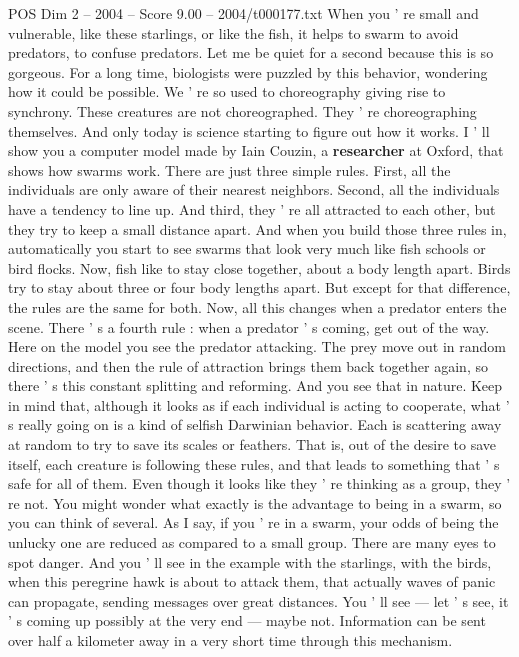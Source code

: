 \begin{textsample}{POS Dim 2 – 2004 – Score 9.00 – 2004/t000177.txt}
When you ' re small and vulnerable, like these starlings, or like the fish, it helps to swarm to avoid predators, to confuse predators.
Let me be quiet for a second because this is so gorgeous.
For a long time, biologists were puzzled by this behavior, wondering how it could be possible.
We ' re so used to choreography giving rise to synchrony.
These creatures are not choreographed.
They ' re choreographing themselves.
And only today is science starting to figure out how it works.
I ' ll show you a computer model made by Iain Couzin, a \textbf{researcher} at Oxford, that shows how swarms work.
There are just three simple rules.
First, all the individuals are only aware of their nearest neighbors.
Second, all the individuals have a tendency to line up.
And third, they ' re all attracted to each other, but they try to keep a small distance apart.
And when you build those three rules in, automatically you start to see swarms that look very much like fish schools or bird flocks.
Now, fish like to stay close together, about a body length apart.
Birds try to stay about three or four body lengths apart.
But except for that difference, the rules are the same for both.
Now, all this changes when a predator enters the scene.
There ' s a fourth rule : when a predator ' s coming, get out of the way.
Here on the model you see the predator attacking.
The prey move out in random directions, and then the rule of attraction brings them back together again, so there ' s this constant splitting and reforming.
And you see that in nature.
Keep in mind that, although it looks as if each individual is acting to cooperate, what ' s really going on is a kind of selfish Darwinian behavior.
Each is scattering away at random to try to save its scales or feathers.
That is, out of the desire to save itself, each creature is following these rules, and that leads to something that ' s safe for all of them.
Even though it looks like they ' re thinking as a group, they ' re not.
You might wonder what exactly is the advantage to being in a swarm, so you can think of several.
As I say, if you ' re in a swarm, your odds of being the unlucky one are reduced as compared to a small group.
There are many eyes to spot danger.
And you ' ll see in the example with the starlings, with the birds, when this peregrine hawk is about to attack them, that actually waves of panic can propagate, sending messages over great distances.
You ' ll see — let ' s see, it ' s coming up possibly at the very end — maybe not.
Information can be sent over half a kilometer away in a very short time through this mechanism.

\end{textsample}
